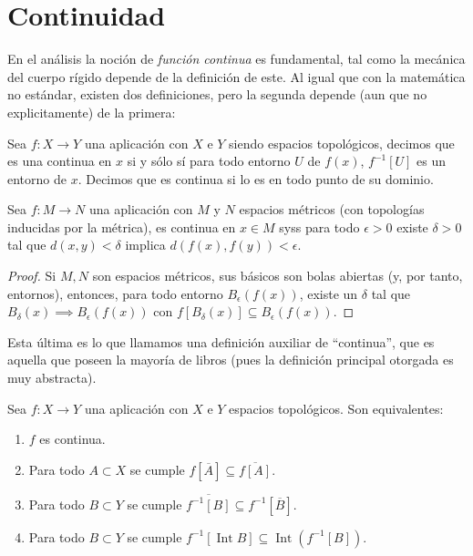 \documentclass[11pt,oneside,a4paper]{book}
\DeclareMathOperator{\Int}{Int}
\begin{document}
\section{Continuidad}
En el análisis la noción de \textit{función continua} es fundamental, tal como la mecánica del cuerpo rígido depende de la definición de este. Al igual que con la matemática no estándar, existen dos definiciones, pero la segunda depende (aun que no explicitamente) de la primera:
\begin{mydef}
Sea $f:X\rightarrow Y$ una aplicación con $X$ e $Y$ siendo espacios topológicos, decimos que es una continua en $x$ si y sólo sí para todo entorno $U$ de $f(x)$, $f^{-1}[U]$ es un entorno de $x$. Decimos que es continua si lo es en todo punto de su dominio.
\end{mydef}
\begin{thm}
Sea $f:M\rightarrow N$ una aplicación con $M$ y $N$ espacios métricos (con topologías inducidas por la métrica), es continua en $x\in M$ syss para todo $\epsilon\gt 0$ existe $\delta\gt 0$ tal que $d(x,y)\lt\delta$ implica $d(f(x),f(y))\lt\epsilon$.
\end{thm}
\begin{proof}
Si $M,N$ son espacios métricos, sus básicos son bolas abiertas (y, por tanto, entornos), entonces, para todo entorno $B_\epsilon(f(x))$, existe un $\delta$ tal que $B_\delta(x)\implies B_\epsilon(f(x))$ con $f[B_\delta(x)]\subseteq B_\epsilon(f(x))$.
\end{proof}
Esta última es lo que llamamos una definición auxiliar de ``continua'', que es aquella que poseen la mayoría de libros (pues la definición principal otorgada es muy abstracta).
\begin{thm}
Sea $f:X\rightarrow Y$ una aplicación con $X$ e $Y$ espacios topológicos. Son equivalentes:
\begin{enumerate}[$a$)]
\item $f$ es continua.
\item Para todo $A\subset X$ se cumple $f[\overline{A}]\subseteq\overline{f[A]}$.
\item Para todo $B\subset Y$ se cumple $\overline{f^{-1}[B]}\subseteq f^{-1}[\overline{B}]$.
\item Para todo $B\subset Y$ se cumple $f^{-1}[\Int B]\subseteq\Int(f^{-1}[B])$.
\end{enumerate}
\end{thm}
\end{document}
